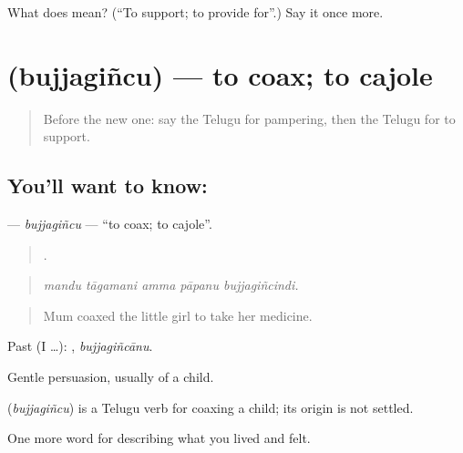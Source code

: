 \begin{tcolorbox}[breakable,colback=teal!4,colframe=teal!35!black,title={Before you move on}]
What does  mean? (\textquotedblleft{}To support; to provide for\textquotedblright{}.) Say it once more.
\end{tcolorbox}
\section[\texorpdfstring{\te{బుజ్జగించు} (bujjagiñcu)}{బుజ్జగించు (bujjagiñcu)}]{ (bujjagiñcu) — to coax; to cajole}

\label{lesson:TE-C532-bujjagincu}



\begin{quote}
Before the new one: say the Telugu for pampering, then the Telugu for to support.
\end{quote}

\subsection*{You'll want to know: }
\textbf{} — \emph{bujjagiñcu} — \textquotedblleft{}to coax; to cajole\textquotedblright{}.

\begin{quote}
    .
\end{quote}

\begin{quote}
\emph{mandu tāgamani amma pāpanu bujjagiñcindi.}
\end{quote}

\begin{quote}
Mum coaxed the little girl to take her medicine.
\end{quote}

Past (I …): , \emph{bujjagiñcānu}.

Gentle persuasion, usually of a child.

\begin{cousinweb}
\textbf{} (\emph{bujjagiñcu}) is a Telugu verb for coaxing a child; its origin is not settled.
\end{cousinweb}

\begin{grammarlens}[title={What you've built}]
One more word for describing what you lived and felt.
\end{grammarlens}

